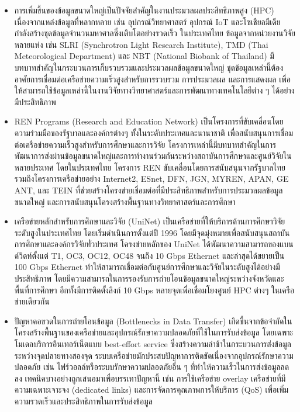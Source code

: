 \documentclass[a4paper,12pt]{extarticle}
\begin{document}
\begin{enumerate}
	\begin{itemize}
		\item การเพิ่มขึ้นของข้อมูลขนาดใหญ่เป็นปัจจัยสำคัญในงานประมวลผลประสิทธิภาพสูง (HPC) เนื่องจากแหล่งข้อมูลที่หลากหลาย เช่น อุปกรณ์วิทยาศาสตร์ อุปกรณ์ IoT และโซเชียลมีเดีย กำลังสร้างชุดข้อมูลจำนวนมหาศาลซึ่งเติบโตอย่างรวดเร็ว ในประเทศไทย ข้อมูลจากหน่วยงานวิจัยหลายแห่ง เช่น SLRI (Synchrotron Light Research Institute), TMD (Thai Meteorological Department) และ NBT (National Biobank of Thailand) มีบทบาทสำคัญในกระบวนการเก็บรวบรวมและประมวลผลข้อมูลขนาดใหญ่ ชุดข้อมูลเหล่านี้ต้องอาศัยการเชื่อมต่อเครือข่ายความเร็วสูงสำหรับการรวบรวม การประมวลผล และการแสดงผล เพื่อให้สามารถใช้ข้อมูลเหล่านี้ในงานวิจัยทางวิทยาศาสตร์และการพัฒนาทางเทคโนโลยีต่าง ๆ ได้อย่างมีประสิทธิภาพ
		\item REN Programs (Research and Education Network)
 		เป็นโครงการที่ขับเคลื่อนโดยความร่วมมือของรัฐบาลและองค์กรต่างๆ ทั้งในระดับประเทศและนานาชาติ เพื่อสนับสนุนการเชื่อมต่อเครือข่ายความเร็วสูงสำหรับการศึกษาและการวิจัย โครงการเหล่านี้มีบทบาทสำคัญในการพัฒนาการส่งผ่านข้อมูลขนาดใหญ่และการทำงานร่วมกันระหว่างสถาบันการศึกษาและศูนย์วิจัยในหลายประเทศ โดยในประเทศไทย โครงการ REN ขับเคลื่อนโดยการสนับสนุนจากรัฐบาลไทย รวมถึงโครงการเครือข่ายอย่าง Internet2, ESnet, DFN, JGN, MYREN, APAN, GE ANT, และ TEIN ที่ช่วยสร้างโครงข่ายเชื่อมต่อที่มีประสิทธิภาพสำหรับการประมวลผลข้อมูลขนาดใหญ่ และการสนับสนุนโครงสร้างพื้นฐานทางวิทยาศาสตร์และการศึกษา
		\item เครือข่ายหลักสำหรับการศึกษาและวิจัย (UniNet) เป็นเครือข่ายที่ให้บริการด้านการศึกษาวิจัยระดับสูงในประเทศไทย โดยเริ่มดำเนินการตั้งแต่ปี 1996 โดยมีจุดมุ่งหมายเพื่อสนับสนุนสถาบันการศึกษาและองค์กรวิจัยทั่วประเทศ โครงข่ายหลักของ UniNet ได้พัฒนาความสามารถของแบนด์วิดท์ตั้งแต่ T1, OC3, OC12, OC48 จนถึง 10 Gbps Ethernet และล่าสุดได้ขยายเป็น 100 Gbps Ethernet ทำให้สามารถเชื่อมต่อกับศูนย์การศึกษาและวิจัยในระดับสูงได้อย่างมีประสิทธิภาพ โดยมีความสามารถในการรองรับการถ่ายโอนข้อมูลขนาดใหญ่ระหว่างจังหวัดและพื้นที่การศึกษา อีกทั้งมีการติดตั้งลิงก์ 10 Gbps หลายจุดเพื่อเชื่อมโยงศูนย์ HPC ต่างๆ ในเครือข่ายเดียวกัน
		\item ปัญหาคอขวดในการถ่ายโอนข้อมูล (Bottlenecks in Data Transfer) เกิดขึ้นจากข้อจำกัดในโครงสร้างพื้นฐานของเครือข่ายและอุปกรณ์รักษาความปลอดภัยที่ใช้ในการรับส่งข้อมูล โดยเฉพาะโมเดลบริการอินเทอร์เน็ตแบบ best-effort service ซึ่งสร้างความล่าช้าในกระบวนการส่งข้อมูลระหว่างจุดปลายทางสองจุด ระบบเครือข่ายมักประสบปัญหาการติดขัดเนื่องจากอุปกรณ์รักษาความปลอดภัย เช่น ไฟร์วอลล์หรือระบบรักษาความปลอดภัยอื่น ๆ ที่ทำให้ความเร็วในการส่งข้อมูลลดลง เทคนิคบางอย่างถูกเสนอมาเพื่อบรรเทาปัญหานี้ เช่น การใช้เครือข่าย overlay เครือข่ายที่มีความเฉพาะเจาะจง (dedicated links) และการจัดการคุณภาพการให้บริการ (QoS) เพื่อเพิ่มความรวดเร็วและประสิทธิภาพในการรับส่งข้อมูล

\end{itemize}
\end{enumerate}
\end{document}
